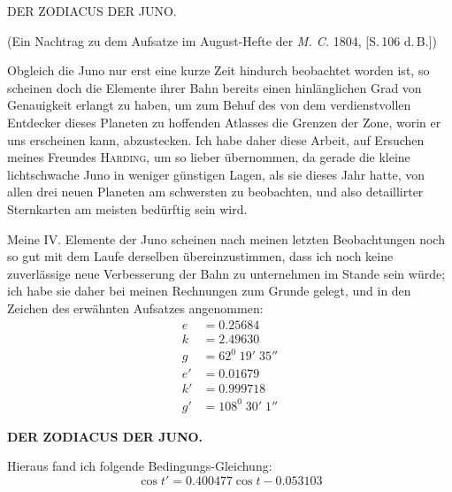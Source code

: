 \clearpage
{}%
\vspace*{.16\textheight}
{\centering
{\small DER ZODIACUS DER JUNO.\par}
\medskip
{\small (Ein Nachtrag zu dem Aufsatze im August-Hefte der \textit{M. C.} 1804, [S.\,106 d.\,B.])\par}
}
\bigskip
\noindent{}\par
\medskip
Obgleich die Juno nur erst eine kurze Zeit hindurch beobachtet worden ist,
so scheinen doch die Elemente ihrer Bahn bereits einen hinlänglichen Grad
von Genauigkeit erlangt zu haben, um zum Behuf des von dem verdienstvollen
Entdecker dieses Planeten zu hoffenden Atlasses die Grenzen der Zone, worin er
uns erscheinen kann, abzustecken. Ich habe daher diese Arbeit, auf Ersuchen
meines Freundes \textsc{Harding}, um so lieber übernommen, da gerade die kleine
lichtschwache Juno in weniger günstigen Lagen, als sie dieses Jahr hatte, von
allen drei neuen Planeten am schwersten zu beobachten, und also detaillirter
Sternkarten am meisten bedürftig sein wird.

Meine IV. Elemente der Juno scheinen nach meinen letzten Beobachtungen
noch so gut mit dem Laufe derselben übereinzustimmen, dass ich noch keine
zuverlässige neue Verbesserung der Bahn zu unternehmen im Stande sein würde;
ich habe sie daher bei meinen Rechnungen zum Grunde gelegt, und in den
Zeichen des erwähnten Aufsatzes angenommen:
\[
\begin{aligned}
e&=0.25684\\
k&=2.49630\\
g&=62^0\;19'\;35''\\
e'&=0.01679\\
k'&=0.999718\\
g'&=108^0\;30'\;1''
\end{aligned}
\]
\par\clearpage
\noindent{}%
%
\parbox[t]{\dimexpr\linewidth-24mm\relax}{\centering\fontsize{7.4}{9.2}\selectfont\bfseries DER ZODIACUS DER JUNO.\par}%
\makebox[12mm][r]{}\par\nobreak\smallskip
\noindent Hieraus fand ich folgende Bedingungs-Gleichung:
\[
\cos t'=0.400477\cos t-0.053103
\]

